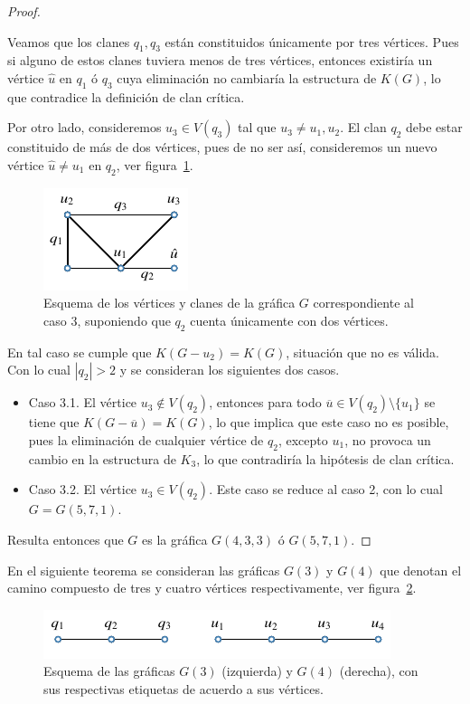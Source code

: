 \documentclass[12pt]{book}
\theoremstyle{definition}
\begin{document}
\begin{proof}
\begin{itemize}
Veamos que los clanes $q_1,q_3$ están constituidos únicamente por tres vértices. Pues si alguno de estos clanes tuviera menos de tres vértices, entonces existiría un vértice $\hat{u}$ en $q_1$ ó $q_3$ cuya eliminación no cambiaría la estructura de $K(G)$, lo que contradice la definición de clan crítica.

Por otro lado, consideremos $u_3\in V(q_3)$ tal que $u_3\neq u_1,u_2$. El clan $q_2$ debe estar constituido de más de dos vértices, pues de no ser así, consideremos un nuevo vértice $\hat{u}\neq u_1$ en $q_2$, ver figura~\ref{F4}.

\begin{figure}[!htbp]
	\centering
	\includegraphics[scale=1.2]{Fig4.pdf}
	\caption{Esquema de los vértices y clanes de la gráfica $G$ correspondiente al caso 3, suponiendo que $q_2$ cuenta únicamente con dos vértices.\label{F4}}
\end{figure}

En tal caso se cumple que $K(G-u_2)=K(G)$, situación que no es válida. Con lo cual $|q_2|>2$ y se consideran los siguientes dos casos.
\begin{itemize}
\item Caso 3.1.
El vértice $u_3\notin V(q_2)$, entonces para todo $\overline{u}\in V(q_2)\setminus\{u_1\}$ se tiene que $K(G-\overline{u})=K(G)$, lo que implica que este caso no es posible, pues la eliminación de cualquier vértice de $q_2$, excepto $u_1$, no provoca un cambio en la estructura de $K_3$, lo que contradiría la hipótesis de clan crítica.

\item Caso 3.2.
El vértice $u_3\in V(q_2)$. Este caso se reduce al caso 2, con lo cual $G=G(5,7,1)$.
\end{itemize}
\end{itemize}
Resulta entonces que $G$ es la gráfica $G(4,3,3)$ ó $G(5,7,1)$.
\end{proof}


En el siguiente teorema se consideran las gráficas $G(3)$ y $G(4)$ que denotan el camino compuesto de tres y cuatro vértices respectivamente, ver figura~\ref{F5}.

\begin{figure}[!htbp]
	\centering
	\includegraphics[scale=1.2]{Fig5.pdf}
	\caption{Esquema de las gráficas $G(3)$ (izquierda) y $G(4)$ (derecha), con sus respectivas etiquetas de acuerdo a sus vértices.\label{F5}}
\end{figure}
\end{document}
